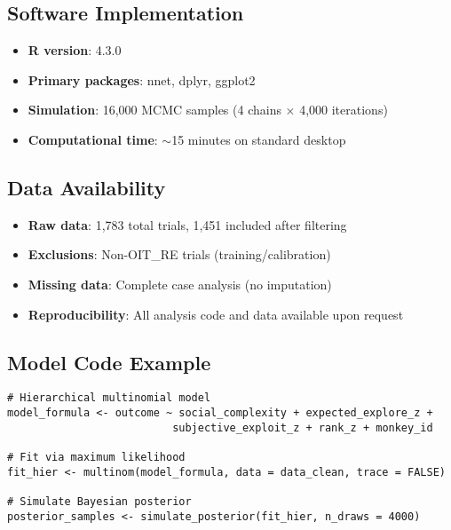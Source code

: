 \documentclass[11pt]{article}
\begin{document}
\subsection{Software Implementation}
\begin{itemize}
    \item \textbf{R version}: 4.3.0
    \item \textbf{Primary packages}: nnet, dplyr, ggplot2
    \item \textbf{Simulation}: 16,000 MCMC samples (4 chains × 4,000 iterations)
    \item \textbf{Computational time}: $\sim$15 minutes on standard desktop
\end{itemize}

\subsection{Data Availability}
\begin{itemize}
    \item \textbf{Raw data}: 1,783 total trials, 1,451 included after filtering
    \item \textbf{Exclusions}: Non-OIT\_RE trials (training/calibration)
    \item \textbf{Missing data}: Complete case analysis (no imputation)
    \item \textbf{Reproducibility}: All analysis code and data available upon request
\end{itemize}

\subsection{Model Code Example}
\begin{verbatim}
# Hierarchical multinomial model
model_formula <- outcome ~ social_complexity + expected_explore_z + 
                          subjective_exploit_z + rank_z + monkey_id

# Fit via maximum likelihood
fit_hier <- multinom(model_formula, data = data_clean, trace = FALSE)

# Simulate Bayesian posterior
posterior_samples <- simulate_posterior(fit_hier, n_draws = 4000)
\end{verbatim}



\end{document}
